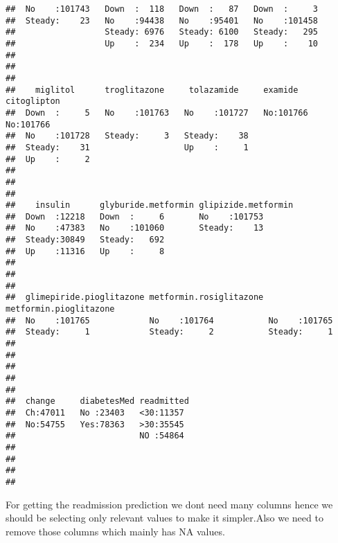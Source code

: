\documentclass[]{article}
\begin{document}
\begin{verbatim}
##  No    :101743   Down  :  118   Down  :   87   Down  :     3  
##  Steady:    23   No    :94438   No    :95401   No    :101458  
##                  Steady: 6976   Steady: 6100   Steady:   295  
##                  Up    :  234   Up    :  178   Up    :    10  
##                                                               
##                                                               
##                                                               
##    miglitol      troglitazone     tolazamide     examide     citoglipton
##  Down  :     5   No    :101763   No    :101727   No:101766   No:101766  
##  No    :101728   Steady:     3   Steady:    38                          
##  Steady:    31                   Up    :     1                          
##  Up    :     2                                                          
##                                                                         
##                                                                         
##                                                                         
##    insulin      glyburide.metformin glipizide.metformin
##  Down  :12218   Down  :     6       No    :101753      
##  No    :47383   No    :101060       Steady:    13      
##  Steady:30849   Steady:   692                          
##  Up    :11316   Up    :     8                          
##                                                        
##                                                        
##                                                        
##  glimepiride.pioglitazone metformin.rosiglitazone metformin.pioglitazone
##  No    :101765            No    :101764           No    :101765         
##  Steady:     1            Steady:     2           Steady:     1         
##                                                                         
##                                                                         
##                                                                         
##                                                                         
##                                                                         
##  change     diabetesMed readmitted 
##  Ch:47011   No :23403   <30:11357  
##  No:54755   Yes:78363   >30:35545  
##                         NO :54864  
##                                    
##                                    
##                                    
## 
\end{verbatim}

For getting the readmission prediction we dont need many columns hence
we should be selecting only relevant values to make it simpler.Also we
need to remove those columns which mainly has NA values.
\end{document}

